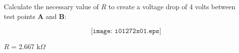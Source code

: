 

Calculate the necessary value of $R$ to create a voltage drop of 4 volts between test points {\bf A} and {\bf B}:

$$\texttt{[image: i01272x01.eps]}$$







$R$ = 2.667 k$\Omega$
 










